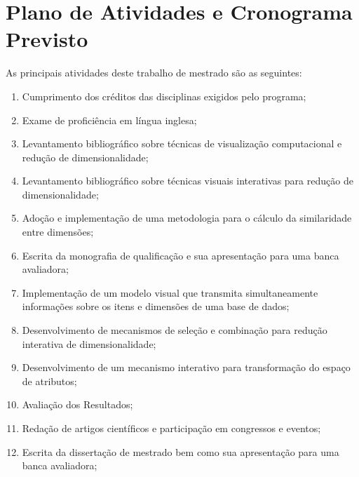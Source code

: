 
\section{Plano de Atividades e Cronograma Previsto}\label{sec:cronograma}

As principais atividades deste trabalho de mestrado são as seguintes:

\begin{enumerate}

    \item Cumprimento dos créditos das disciplinas exigidos pelo programa;

    \item Exame de proficiência em língua inglesa;

    \item Levantamento bibliográfico sobre técnicas de visualização computacional e redução de dimensionalidade;   

    \item Levantamento bibliográfico sobre técnicas visuais interativas para redução de dimensionalidade;  

    \item Adoção e implementação de uma metodologia para o cálculo da similaridade entre dimensões;

    \item Escrita da monografia de qualificação e sua apresentação para uma banca avaliadora;

    \item Implementação de um modelo visual que transmita simultaneamente informações sobre os itens e dimensões de uma base de dados;

    \item Desenvolvimento de mecanismos de seleção e combinação para redução interativa de dimensionalidade;

    \item Desenvolvimento de um mecanismo interativo para transformação do espaço de atributos;

    \item Avaliação dos Resultados;

    \item Redação de artigos científicos e participação em congressos e eventos; 

    \item Escrita da dissertação de mestrado bem como sua apresentação para uma banca avaliadora;

\end{enumerate}

